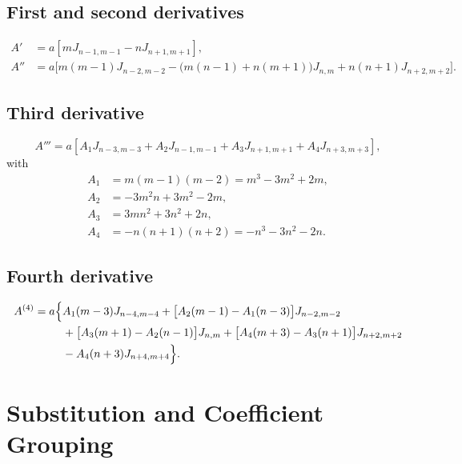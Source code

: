 \documentclass[11pt]{article}
\begin{document}
\subsection{First and second derivatives}
\begin{align}
A' &= a\left[mJ_{n-1,m-1}-nJ_{n+1,m+1}\right], \\[2pt]
A'' &= a\Big[m(m-1)J_{n-2,m-2}-\big(m(n-1)+n(m+1)\big)J_{n,m}+n(n+1)J_{n+2,m+2}\Big].
\end{align}

\subsection{Third derivative}
\begin{equation}
A'''=a\left[A_1J_{n-3,m-3}+A_2J_{n-1,m-1}+A_3J_{n+1,m+1}+A_4J_{n+3,m+3}\right],
\end{equation}
with
\begin{align}
A_1&=m(m-1)(m-2)=m^3-3m^2+2m, \\
A_2&=-3m^2n+3m^2-2m, \\
A_3&=3mn^2+3n^2+2n, \\
A_4&=-n(n+1)(n+2)=-n^3-3n^2-2n.
\end{align}

\subsection{Fourth derivative}
\begin{align}
A^{(4)}=a\Big\{&A_1(m-3)J_{n-4,m-4}+\big[A_2(m-1)-A_1(n-3)\big]J_{n-2,m-2} \notag\\
&+\big[A_3(m+1)-A_2(n-1)\big]J_{n,m}
+\big[A_4(m+3)-A_3(n+1)\big]J_{n+2,m+2} \notag\\
&-A_4(n+3)J_{n+4,m+4}\Big\}.
\end{align}

\section{Substitution and Coefficient Grouping}
\end{document}
